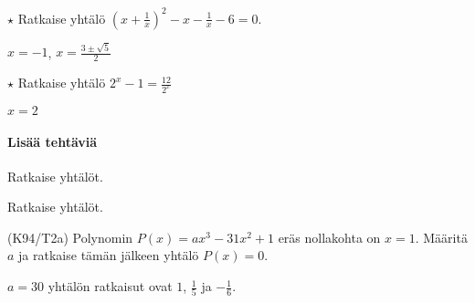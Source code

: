 \begin{tehtavasivu}
\begin{tehtava}
	$ \star $ Ratkaise yhtälö $(x+\frac{1}{x})^2-x-\frac{1}{x}-6 = 0$.
	\begin{vastaus}
		$x = -1$, $x = \frac{3\pm \sqrt{5}}{2}$
	\end{vastaus}
\end{tehtava}

\begin{tehtava}
	$ \star $ Ratkaise yhtälö $2^x-1=\frac{12}{2^x}$
	\begin{vastaus}
	$x=2$
	\end{vastaus}
\end{tehtava}

\paragraph*{Lisää tehtäviä}

\begin{tehtava}
    Ratkaise yhtälöt.
    \begin{alakohdat}
    \end{alakohdat}
    \begin{vastaus}
        \begin{alakohdat}
        \end{alakohdat}
    \end{vastaus}
\end{tehtava}

\begin{tehtava}
    Ratkaise yhtälöt.
    \begin{alakohdat}
    \end{alakohdat}
    \begin{vastaus}
        \begin{alakohdat}
        \end{alakohdat}
    \end{vastaus}
\end{tehtava}

\begin{tehtava} %
(K94/T2a) Polynomin $P(x)=ax^3-31x^2+1$ eräs nollakohta on $x=1$. Määritä $a$ ja ratkaise tämän jälkeen yhtälö $P(x)=0$.
\begin{vastaus}
      $a=30$ yhtälön ratkaisut ovat $1$, $\frac{1}{5}$ ja $-\frac{1}{6}$.
    \end{vastaus}
\end{tehtava}

\end{tehtavasivu}
